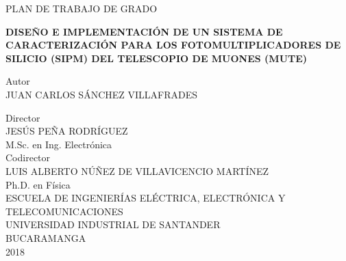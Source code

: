 \documentclass[11pt,letterpaper,oneside]{book}
\title{}
\begin{document}
\begin{center}
\thispagestyle{empty}
\fontsize{11pt}{11pt}\selectfont 

PLAN DE TRABAJO DE GRADO 

\vspace{3cm}


\textbf {DISEÑO E IMPLEMENTACIÓN DE UN SISTEMA DE  CARACTERIZACIÓN PARA LOS FOTOMULTIPLICADORES DE SILICIO (SIPM) DEL TELESCOPIO DE MUONES (MUTE)}


\vspace{3cm}

{ Autor}
\\
{JUAN CARLOS SÁNCHEZ VILLAFRADES}

\vspace{2cm}
{ Director}
\\
{ JESÚS PEÑA RODRÍGUEZ\\M.Sc. en Ing. Electrónica}\\
\vspace{2cm}
{ Codirector}\\
{ LUIS ALBERTO NÚÑEZ DE VILLAVICENCIO MARTÍNEZ}\\ Ph.D. en Física \\
\vspace{2cm}
{ ESCUELA DE INGENIERÍAS ELÉCTRICA, ELECTRÓNICA Y TELECOMUNICACIONES
}\\
{ UNIVERSIDAD INDUSTRIAL DE SANTANDER}\\
{ BUCARAMANGA}\\
{ 2018}

  \end{center}
\large
\end{document}
